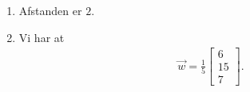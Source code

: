 \begin{enumerate}
	\item Afstanden er $2$.


	\item Vi har at
	\begin{align*}
	\vec{w}=\frac{1}{5}\begin{bmatrix}
	6\\15\\7
	\end{bmatrix}.
	\end{align*}
	
	
\end{enumerate}
